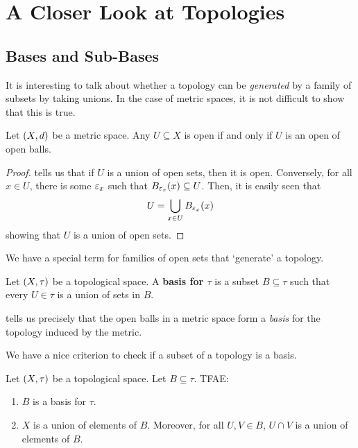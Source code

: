 \section{A Closer Look at Topologies}

\subsection{Bases and Sub-Bases}

It is interesting to talk about whether a topology can be \textit{generated} by a family of subsets by taking unions. In the case of metric spaces, it is not difficult to show that this is true.

\begin{boxproposition}\label{Ch1:Prop:Met_Top_gen_by_open_balls}
    Let $\left( X, d \right)$ be a metric space. Any $U \subseteq X$ is open if and only if $U$ is an open of open balls.
\end{boxproposition}
\begin{proof}
     tells us that if $U$ is a union of open sets, then it is open. Conversely, for all $x \in U$, there is some $\varepsilon_x$ such that $B_{\varepsilon_x}(x) \subseteq U$. Then, it is easily seen that
    \begin{align*}
        U = \bigcup_{x \in U} B_{\varepsilon_x}(x)
    \end{align*}
    showing that $U$ is a union of open sets.
\end{proof}

We have a special term for families of open sets that `generate' a topology.

\begin{boxdefinition}
    Let $\left( X, \tau \right)$ be a topological space. A \textbf{basis for $\tau$} is a subset $B \subseteq \tau$ such that every $U \in \tau$ is a union of sets in $B$.
\end{boxdefinition}

 tells us precisely that the open balls in a metric space form a \textit{basis} for the topology induced by the metric.

We have a nice criterion to check if a subset of a topology is a basis.

\begin{boxproposition}
    Let $\left( X, \tau \right)$ be a topological space. Let $B \subseteq \tau$. TFAE:
    \begin{enumerate}
        \item $B$ is a basis for $\tau$.
        \item $X$ is a union of elements of $B$. Moreover, for all $U, V \in B$, $U \cap V$ is a union of elements of $B$.
    \end{enumerate}
\end{boxproposition}

